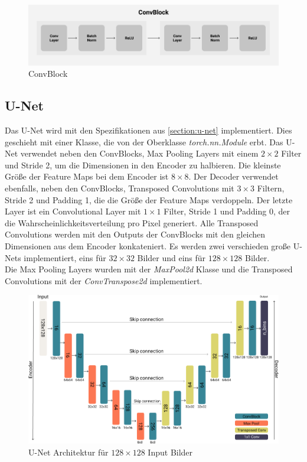 \begin{figure}[H]
  \centering
  \includegraphics[width=1\textwidth]{resources/networks/convblock.png}
  \caption{ConvBlock}
  \label{image:convBlock}
\end{figure}

\subsection{U-Net}
Das U-Net wird mit den Spezifikationen aus \ref{section:u-net} implementiert. Dies geschieht mit einer Klasse, die von der Oberklasse
\textit{torch.nn.Module} erbt. Das U-Net verwendet neben den ConvBlocks, Max Pooling Layers mit einem $2 \times 2$ Filter und Stride 2,
um die Dimensionen in den Encoder zu halbieren. Die kleinste Größe der Feature Maps bei dem Encoder ist $8 \times 8$. 
Der Decoder verwendet ebenfalls, neben den ConvBlocks, Transposed Convolutions mit $3 \times 3$ 
Filtern, Stride 2 und Padding 1, die die Größe der Feature Maps verdoppeln. Der letzte Layer ist ein Convolutional Layer mit $1 \times 1$ Filter, 
Stride 1 und Padding 0, der die
Wahrscheinlichkeitsverteilung pro Pixel generiert. Alle Transposed Convolutions werden mit den Outputs der ConvBlocks mit den gleichen
Dimensionen aus dem Encoder konkateniert. 
Es werden zwei verschieden große U-Nets implementiert, eins für $32 \times 32$ Bilder und eins für 
$128 \times 128$ Bilder.
\\
Die Max Pooling Layers wurden mit der \textit{MaxPool2d} Klasse und die Transposed Convolutions mit der \textit{ConvTranspose2d} implementiert.

\begin{figure}[H]
  \centering
  \includegraphics[width=1\textwidth]{resources/networks/128u-net.png}
  \caption{U-Net Architektur für $128 \times 128$ Input Bilder}
  \label{image:128u-net}
\end{figure}



